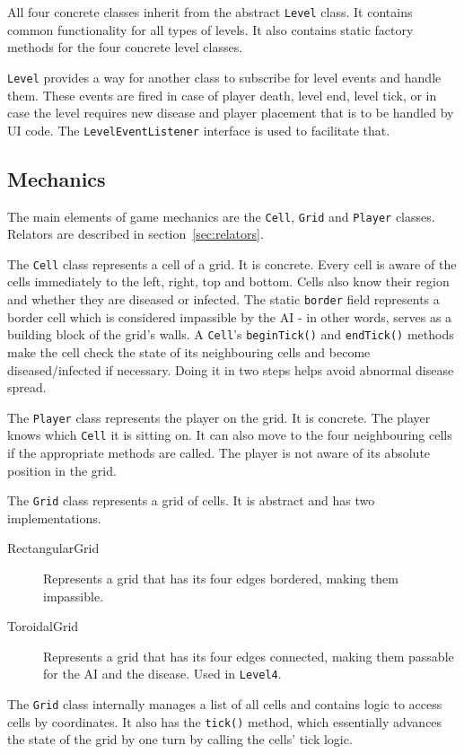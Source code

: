 \documentclass[a4paper]{article}
\begin{document}
		All four concrete classes inherit from the abstract \verb|Level| class. It contains common functionality for all types of levels. It also contains static factory methods for the four concrete level classes.
		
		\verb|Level| provides a way for another class to subscribe for level events and handle them. These events are fired in case of player death, level end, level tick, or in case the level requires new disease and player placement that is to be handled by UI code. The \verb|LevelEventListener| interface is used to facilitate that.
	
	\subsection{Mechanics}
		
		The main elements of game mechanics are the \verb|Cell|, \verb|Grid| and \verb|Player| classes. Relators are described in section~\ref{sec:relators}.
		
		The \verb|Cell| class represents a cell of a grid. It is concrete. Every cell is aware of the cells immediately to the left, right, top and bottom. Cells also know their region and whether they are diseased or infected. The static \verb|border| field represents a border cell which is considered impassible by the AI - in other words, serves as a building block of the grid's walls. A \verb|Cell|'s \verb|beginTick()| and \verb|endTick()| methods make the cell check the state of its neighbouring cells and become diseased/infected if necessary. Doing it in two steps helps avoid abnormal disease spread.
		
		The \verb|Player| class represents the player on the grid. It is concrete. The player knows which \verb|Cell| it is sitting on. It can also move to the four neighbouring cells if the appropriate methods are called. The player is not aware of its absolute position in the grid.
		
		The \verb|Grid| class represents a grid of cells. It is abstract and has two implementations.
		\begin{description}
		\item[RectangularGrid] Represents a grid that has its four edges bordered, making them impassible.
		\item[ToroidalGrid] Represents a grid that has its four edges connected, making them passable for the AI and the disease. Used in \verb|Level4|.
		\end{description}
        The \verb|Grid| class internally manages a list of all cells and contains logic to access cells by coordinates. It also has the \verb|tick()| method, which essentially advances the state of the grid by one turn by calling the cells' tick logic.
        
\end{document}
